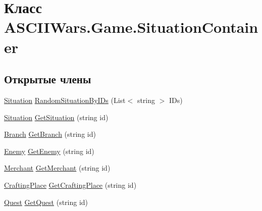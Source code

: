 \hypertarget{class_a_s_c_i_i_wars_1_1_game_1_1_situation_container}{}\section{Класс A\+S\+C\+I\+I\+Wars.\+Game.\+Situation\+Container}
\label{class_a_s_c_i_i_wars_1_1_game_1_1_situation_container}
\subsection*{Открытые члены}
\begin{DoxyCompactItemize}
\item 
\hyperlink{class_a_s_c_i_i_wars_1_1_game_1_1_situation}{Situation} \hyperlink{class_a_s_c_i_i_wars_1_1_game_1_1_situation_container_a83ebb8c14380b5171524c8ebd4c2a581}{Random\+Situation\+By\+I\+Ds} (List$<$ string $>$ I\+Ds)
\item 
\hyperlink{class_a_s_c_i_i_wars_1_1_game_1_1_situation}{Situation} \hyperlink{class_a_s_c_i_i_wars_1_1_game_1_1_situation_container_aad379806144d48b5d6c66e409065473c}{Get\+Situation} (string id)
\item 
\hyperlink{class_a_s_c_i_i_wars_1_1_game_1_1_branch}{Branch} \hyperlink{class_a_s_c_i_i_wars_1_1_game_1_1_situation_container_a3bab9a3b20ced9a6b3408601ff381b51}{Get\+Branch} (string id)
\item 
\hyperlink{class_a_s_c_i_i_wars_1_1_game_1_1_enemy}{Enemy} \hyperlink{class_a_s_c_i_i_wars_1_1_game_1_1_situation_container_a559089971fe865f682768b43173181c4}{Get\+Enemy} (string id)
\item 
\hyperlink{class_a_s_c_i_i_wars_1_1_game_1_1_merchant}{Merchant} \hyperlink{class_a_s_c_i_i_wars_1_1_game_1_1_situation_container_a1e6b56a5e6db3eec1b59414956c245ae}{Get\+Merchant} (string id)
\item 
\hyperlink{class_a_s_c_i_i_wars_1_1_game_1_1_crafting_place}{Crafting\+Place} \hyperlink{class_a_s_c_i_i_wars_1_1_game_1_1_situation_container_a537f25cbf5d97a989954c421b6ea1a21}{Get\+Crafting\+Place} (string id)
\item 
\hyperlink{class_a_s_c_i_i_wars_1_1_game_1_1_quest}{Quest} \hyperlink{class_a_s_c_i_i_wars_1_1_game_1_1_situation_container_ac15145909b7206c2c2a7aa13f770a9a0}{Get\+Quest} (string id)
\end{DoxyCompactItemize}
